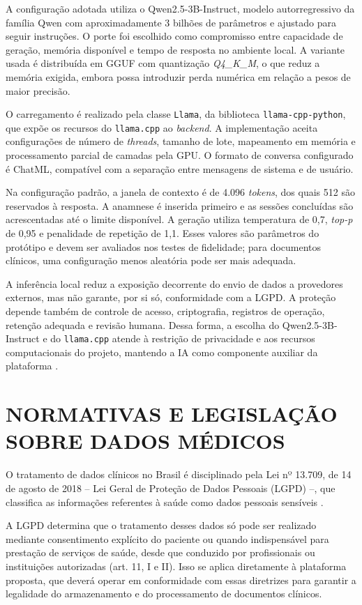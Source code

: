 A configuração adotada utiliza o Qwen2.5-3B-Instruct, modelo autorregressivo da família Qwen com aproximadamente 3 bilhões de parâmetros e ajustado para seguir instruções. O porte foi escolhido como compromisso entre capacidade de geração, memória disponível e tempo de resposta no ambiente local. A variante usada é distribuída em GGUF com quantização \textit{Q4\_K\_M}, o que reduz a memória exigida, embora possa introduzir perda numérica em relação a pesos de maior precisão.

O carregamento é realizado pela classe \texttt{Llama}, da biblioteca \texttt{llama-cpp-python}, que expõe os recursos do \texttt{llama.cpp} ao \textit{backend}. A implementação aceita configurações de número de \textit{threads}, tamanho de lote, mapeamento em memória e processamento parcial de camadas pela GPU. O formato de conversa configurado é ChatML, compatível com a separação entre mensagens de sistema e de usuário.

Na configuração padrão, a janela de contexto é de 4.096 \textit{tokens}, dos quais 512 são reservados à resposta. A anamnese é inserida primeiro e as sessões concluídas são acrescentadas até o limite disponível. A geração utiliza temperatura de 0,7, \textit{top-p} de 0,95 e penalidade de repetição de 1,1. Esses valores são parâmetros do protótipo e devem ser avaliados nos testes de fidelidade; para documentos clínicos, uma configuração menos aleatória pode ser mais adequada.

A inferência local reduz a exposição decorrente do envio de dados a provedores externos, mas não garante, por si só, conformidade com a LGPD. A proteção depende também de controle de acesso, criptografia, registros de operação, retenção adequada e revisão humana. Dessa forma, a escolha do Qwen2.5-3B-Instruct e do \texttt{llama.cpp} atende à restrição de privacidade e aos recursos computacionais do projeto, mantendo a IA como componente auxiliar da plataforma \cite{brasil2018lei}.

\section{NORMATIVAS E LEGISLAÇÃO SOBRE DADOS MÉDICOS}

O tratamento de dados clínicos no Brasil é disciplinado pela Lei nº 13.709, de 14 de agosto de 2018 -- Lei Geral de Proteção de Dados Pessoais (LGPD) --, que classifica as informações referentes à saúde como dados pessoais sensíveis \cite{brasil2018lei}.

A LGPD determina que o tratamento desses dados só pode ser realizado mediante consentimento explícito do paciente ou quando indispensável para prestação de serviços de saúde, desde que conduzido por profissionais ou instituições autorizadas (art. 11, I e II). Isso se aplica diretamente à plataforma proposta, que deverá operar em conformidade com essas diretrizes para garantir a legalidade do armazenamento e do processamento de documentos clínicos.

